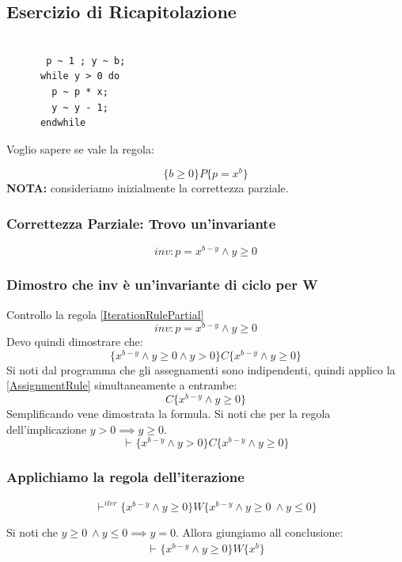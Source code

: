 				      				\subsection{Esercizio di Ricapitolazione}
				      				\begin{esempio}
				      					\begin{lstlisting}
	
	   p ~ 1 ; y ~ b; 
      while y > 0 do
        p ~ p * x;
        y ~ y - 1;
      endwhile      						\end{lstlisting}
				      Voglio sapere se vale la regola:
				      
				      \[\{b \geq 0\}P\{p = x^b\}\]
				      \textbf{NOTA:} consideriamo inizialmente la correttezza parziale.
				      \subsubsection{Correttezza Parziale: Trovo un'invariante}
				      \[inv: p = x^{b-y} \land y \geq 0\]
				      \subsubsection{Dimostro che inv è un'invariante di ciclo per W}
				      Controllo la regola \ref{IterationRulePartial}
				      \[inv: p = x^{b-y} \land y \geq 0\]
				      Devo quindi dimostrare che:
				      \[\{x^{b-y} \land y \geq 0 \land y > 0\}C\{x^{b-y} \land y \geq 0\}\] 
				      Si noti dal programma che gli assegnamenti sono indipendenti, quindi applico la \ref{AssignmentRule} simultaneamente a entrambe:
				      \[C\{x^{b-y} \land y \geq 0\}\] 
				      Semplificando vene dimostrata la formula. Si noti che per la regola dell'implicazione $y > 0 \implies y \geq 0$.
				      \[\vdash^{}\{x^{b-y} \land y > 0 \}C\{x^{b-y} \land y \geq 0\}\]
				      \subsubsection{Applichiamo la regola dell'iterazione}

  				      \[\vdash^{iter}\{x^{b-y} \land y \geq 0 \}W\{x^{b-y} \land y \geq 0\ \land y \leq 0\}\]
  				       
				      Si noti che $ y \geq 0\ \land y \leq 0 \implies y = 0$. Allora giungiamo all conclusione:
				       				        \begin{align}
  				       \vdash^{}\{x^{b-y} \land y \geq 0 \}W\{x^b\}
      				        \label{Example1}
 				        \end{align}


\end{esempio}
